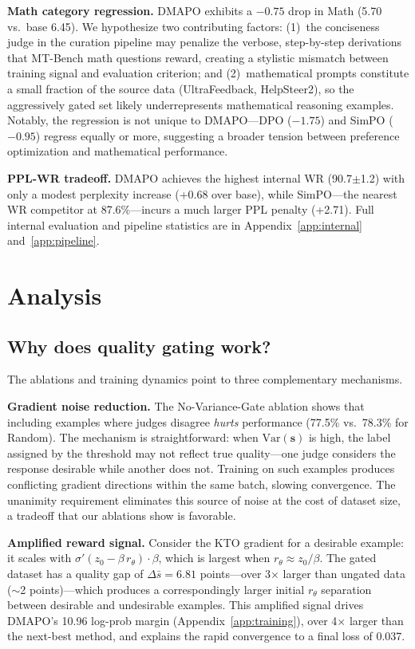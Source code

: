 \documentclass{article}
\newcommand{\method}{DMAPO}
\newcommand{\res}[2]{#1{\scriptsize$\pm$#2}}
\begin{document}
\textbf{Math category regression.} \method{} exhibits a $-0.75$ drop in Math (5.70 vs.\ base 6.45). We hypothesize two contributing factors: (1)~the conciseness judge in the curation pipeline may penalize the verbose, step-by-step derivations that MT-Bench math questions reward, creating a stylistic mismatch between training signal and evaluation criterion; and (2)~mathematical prompts constitute a small fraction of the source data (UltraFeedback, HelpSteer2), so the aggressively gated set likely underrepresents mathematical reasoning examples. Notably, the regression is not unique to \method{}---DPO ($-1.75$) and SimPO ($-0.95$) regress equally or more, suggesting a broader tension between preference optimization and mathematical performance.

\textbf{PPL-WR tradeoff.} \method{} achieves the highest internal WR (\res{90.7}{1.2}) with only a modest perplexity increase (+0.68 over base), while SimPO---the nearest WR competitor at 87.6\%---incurs a much larger PPL penalty (+2.71). Full internal evaluation and pipeline statistics are in Appendix~\ref{app:internal} and~\ref{app:pipeline}.


\section{Analysis}
\label{sec:analysis}

\subsection{Why does quality gating work?}

The ablations and training dynamics point to three complementary mechanisms.

\textbf{Gradient noise reduction.} The No-Variance-Gate ablation shows that including examples where judges disagree \emph{hurts} performance (77.5\% vs.\ 78.3\% for Random). The mechanism is straightforward: when $\text{Var}(\mathbf{s})$ is high, the label assigned by the threshold may not reflect true quality---one judge considers the response desirable while another does not. Training on such examples produces conflicting gradient directions within the same batch, slowing convergence. The unanimity requirement eliminates this source of noise at the cost of dataset size, a tradeoff that our ablations show is favorable.

\textbf{Amplified reward signal.} Consider the KTO gradient for a desirable example: it scales with $\sigma'(z_0 - \beta\, r_\theta) \cdot \beta$, which is largest when $r_\theta \approx z_0 / \beta$. The gated dataset has a quality gap of $\Delta\bar{s} = 6.81$ points---over 3$\times$ larger than ungated data ($\sim$2 points)---which produces a correspondingly larger initial $r_\theta$ separation between desirable and undesirable examples. This amplified signal drives \method{}'s 10.96 log-prob margin (Appendix~\ref{app:training}), over 4$\times$ larger than the next-best method, and explains the rapid convergence to a final loss of 0.037.
\end{document}
